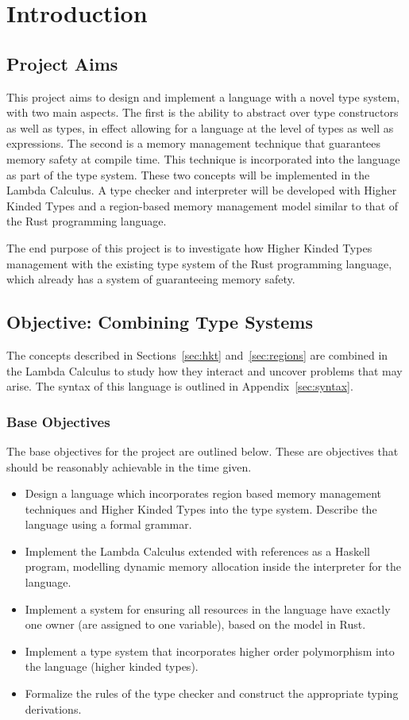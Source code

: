 \chapter{Introduction}\label{sec:intro}

\section{Project Aims}
This project aims to design and implement a language with a novel type system,
with two main aspects. The first is the ability to abstract over type
constructors as well as types, in effect allowing for a language at the level
of types as well as expressions. The second is a memory management technique
that guarantees memory safety at compile time. This technique is incorporated
into the language as part of the type system.  These two concepts will be
implemented in the Lambda Calculus. A type checker and interpreter will be
developed with Higher Kinded Types and a region-based memory management model
similar to that of the Rust programming language.

The end purpose of this project is to investigate how Higher Kinded Types
management with the existing type system of the Rust programming language,
which already has a system of guaranteeing memory safety.

\section{Objective: Combining Type Systems}
The concepts described in Sections~\ref{sec:hkt} and~\ref{sec:regions} are
combined in the Lambda Calculus to study how they interact and uncover problems
that may arise. The syntax of this language is outlined in
Appendix~\ref{sec:syntax}.

\subsection{Base Objectives}
The base objectives for the project are outlined below. These are objectives
that should be reasonably achievable in the time given.

\begin{itemize}
    \item
        Design a language which incorporates region based memory management
        techniques and Higher Kinded Types into the type system. Describe the 
        language using a formal grammar.
    \item
        Implement the Lambda Calculus extended with references as a Haskell
        program, modelling dynamic memory allocation inside the interpreter for
        the language.
    \item
        Implement a system for ensuring all resources in the language have
        exactly one owner (are assigned to one variable), based on the model in
        Rust.
    \item
        Implement a type system that incorporates higher order polymorphism
        into the language (higher kinded types).
    \item
        Formalize the rules of the type checker and construct the appropriate
        typing derivations.
\end{itemize}

